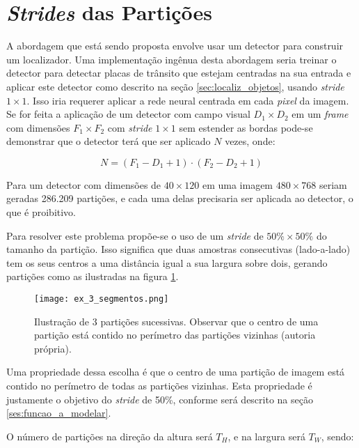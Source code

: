 \section{\emph{Strides} das Partições}
A abordagem que está sendo proposta envolve usar um detector para construir um
localizador. Uma implementação ingênua desta abordagem seria treinar o detector
para detectar placas de trânsito que estejam centradas na sua entrada e aplicar
este detector como descrito na seção \ref{sec:localiz_objetos}, usando
\emph{stride} $1 \times 1$.  Isso iria requerer aplicar a rede neural centrada
em cada \emph{pixel} da imagem. Se for feita a aplicação de um detector com
campo visual $D_1 \times D_2$ em um \emph{frame} com dimensões $F_1 \times
F_2$ com \emph{stride} $1 \times 1$ sem estender as bordas pode-se demonstrar
que o detector terá que ser aplicado $N$ vezes, onde:

\begin{equation}
	N = (F_1 - D_1 + 1) \cdot (F_2 - D_2 + 1)
\end{equation}

Para um detector com dimensões  de $40 \times 120$ em uma imagem
$480 \times 768$ seriam geradas 286.209 partições, e cada uma delas precisaria
ser aplicada ao detector, o que é proibitivo.

Para resolver este problema propõe-se o uso de um \emph{stride} de
$50\% \times 50\%$ do tamanho da partição. Isso significa que duas amostras
consecutivas (lado-a-lado) tem os seus centros a uma distância igual a sua
largura sobre dois, gerando partições como as ilustradas na figura
\ref{fig:ex_3_segmentos}.

\begin{figure}[!htb]
	\centering
	\texttt{[image: ex\_3\_segmentos.png]}
	\caption[Ilustração de 3 partições sucessivas]{
		Ilustração de 3 partições sucessivas.
		Observar que o centro de uma partição está contido no perímetro das
		partições vizinhas (autoria própria).}
	\label{fig:ex_3_segmentos}
\end{figure}

Uma propriedade dessa escolha é que o centro de uma partição de imagem está
contido no perímetro de todas as partições vizinhas. Esta propriedade é
justamente o objetivo do \emph{stride} de 50\%, conforme será descrito na
seção \ref{ses:funcao_a_modelar}.

O número de partições na direção da altura será $T_H$, e na largura será
$T_W$, sendo:

